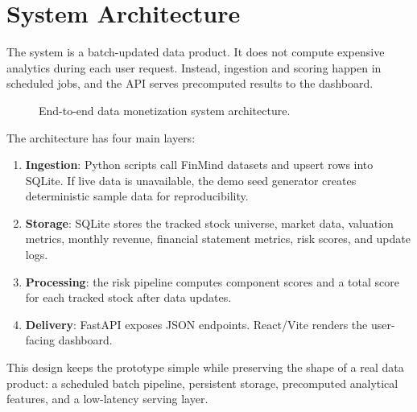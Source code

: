 \section{System Architecture}
\label{sec:system-architecture}

The system is a batch-updated data product. It does not compute expensive analytics during each user request. Instead, ingestion and scoring happen in scheduled jobs, and the API serves precomputed results to the dashboard.

\begin{figure}[H]
    \centering
    \caption{End-to-end data monetization system architecture.}
    \label{fig:architecture}
\end{figure}

The architecture has four main layers:

\begin{enumerate}
    \item \textbf{Ingestion}: Python scripts call FinMind datasets and upsert rows into SQLite. If live data is unavailable, the demo seed generator creates deterministic sample data for reproducibility.
    \item \textbf{Storage}: SQLite stores the tracked stock universe, market data, valuation metrics, monthly revenue, financial statement metrics, risk scores, and update logs.
    \item \textbf{Processing}: the risk pipeline computes component scores and a total score for each tracked stock after data updates.
    \item \textbf{Delivery}: FastAPI exposes JSON endpoints. React/Vite renders the user-facing dashboard.
\end{enumerate}

This design keeps the prototype simple while preserving the shape of a real data product: a scheduled batch pipeline, persistent storage, precomputed analytical features, and a low-latency serving layer.
